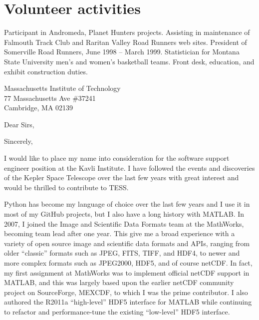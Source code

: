 \documentclass[11pt]{moderncv}  %
\begin{document}
\section{Volunteer activities}
  {Participant in Andromeda, Planet Hunters projects.}
  {Assisting in maintenance of Falmouth Track Club and Raritan Valley
   Road Runners web sites.
   President of Somerville Road Runners, June 1998 -- March 1999.}
  {Statistician for Montana State University men's and women's basketball
  teams.}
  {Front desk, education, and exhibit construction duties.}

\clearpage
{Massachusetts Institute of Technology\\77 Massachusetts Ave \#37241\\Cambridge, MA  02139}
\opening{Dear Sirs,}
\closing{Sincerely,}


\makelettertitle

I would like to place my name into consideration for the software
support engineer position at the Kavli Institute.  I have followed
the events and discoveries of the Kepler Space Telescope over the
last few years with great interest and would be thrilled to contribute
to TESS.

Python has become my language of choice over the last few years and
I use it in most of my GitHub projects, but I also have a long
history with MATLAB.  In 2007, I joined the Image and Scientific
Data Formats team at the MathWorks, becoming  team lead after one
year.  This give me a broad experience with a variety of open source
image and scientific data formats and APIs, ranging from older
“classic” formats such as JPEG, FITS, TIFF, and HDF4, to newer and
more complex formats such as JPEG2000, HDF5, and of course netCDF.
In fact, my first assignment at MathWorks was to implement official
netCDF support in MATLAB, and this was largely based upon the earlier
netCDF community project on SourceForge, MEXCDF, to which I was the
prime contributor.   I also authored the R2011a “high-level” HDF5
interface for MATLAB while continuing to refactor and performance-tune
the existing “low-level” HDF5 interface.
\end{document}
